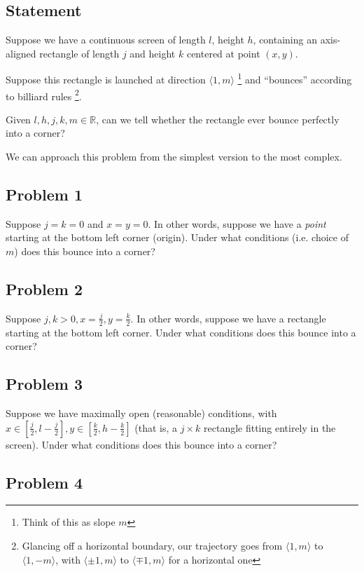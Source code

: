 \documentclass[11pt, oneside]{article} 	%
\begin{document}
\subsection{Statement} 
Suppose we have a continuous screen of length $l$, height $h$, containing an axis-aligned rectangle of length $j$ and height $k$ centered at point $(x, y)$.

Suppose this rectangle is launched at direction $\langle 1, m\rangle$ \footnote {Think of this as slope $m$} and ``bounces'' according to billiard rules \footnote{Glancing off a horizontal boundary, our trajectory goes from $\langle 1, m \rangle$ to $\langle 1, -m \rangle$, with $\langle \pm 1, m \rangle$ to $\langle \mp 1, m \rangle$ for a horizontal one}.

Given $l, h, j, k, m \in \mathbb{R}$, can we tell whether the rectangle ever bounce perfectly into a corner?  

We can approach this problem from the simplest version to the most complex.

\subsection{Problem 1} 

Suppose $j = k = 0$ and $x = y = 0$. In other words, suppose we have a \emph{point} starting at the bottom left corner
 (origin). Under what conditions (i.e. choice of $m$) does this bounce into a corner?


\subsection{Problem 2} 

Suppose $j, k > 0, x = \frac{j}{2}, y = \frac{k}{2}$. In other words, suppose we have a rectangle starting at the bottom left corner. Under what conditions does this bounce into a corner?

\subsection{Problem 3} 

Suppose we have maximally open (reasonable) conditions, with $x \in [\frac{j}{2}, l - \frac{j}{2}], y \in [\frac{k}{2}, h - \frac{k}{2}]$ (that is, a $j \times k$ rectangle fitting entirely in the screen). Under what conditions does this bounce into a corner?


\subsection{Problem 4} 
\end{document}
